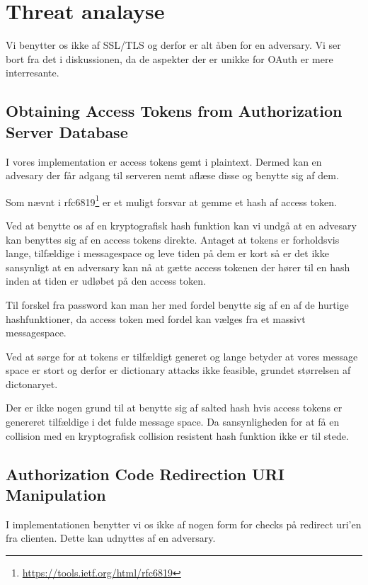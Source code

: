 \documentclass[a4paper,12pt]{article}
\theoremstyle{plain}
\theoremstyle{nonumberplain}
\begin{document}
\section*{Threat analayse}
Vi benytter os ikke af SSL/TLS og derfor er alt åben for en adversary. Vi ser bort fra det i diskussionen, da de aspekter der er unikke for OAuth er mere interresante.

\subsection*{Obtaining Access Tokens from Authorization Server Database}
I vores implementation er access tokens gemt i plaintext. Dermed kan en advesary der får adgang til serveren nemt aflæse disse og benytte sig af dem.

Som nævnt i rfc6819\footnote{\url{https://tools.ietf.org/html/rfc6819}} er et muligt forsvar at gemme et hash af access token.

Ved at benytte os af en kryptografisk hash funktion kan vi undgå at en advesary kan benyttes sig af en access tokens direkte. Antaget at tokens er forholdsvis lange, tilfældige i messagespace og leve tiden på dem er kort så er det ikke sansynligt at en adversary kan nå at gætte access tokenen der hører til en hash inden at tiden er udløbet på den access token.

Til forskel fra password kan man her med fordel benytte sig af en af de hurtige hashfunktioner, da access token med fordel kan vælges fra et massivt messagespace.

Ved at sørge for at tokens er tilfældigt generet og lange betyder at vores message space er stort og derfor er dictionary attacks ikke feasible, grundet størrelsen af dictonaryet.

Der er ikke nogen grund til at benytte sig af salted hash hvis access tokens er genereret tilfældige i det fulde message space. Da sansynligheden for at få en collision med en kryptografisk collision resistent hash funktion ikke er til stede.

\subsection*{Authorization Code Redirection URI Manipulation}
I implementationen benytter vi os ikke af nogen form for checks på redirect uri'en fra clienten. Dette kan udnyttes af en adversary.
\end{document}
